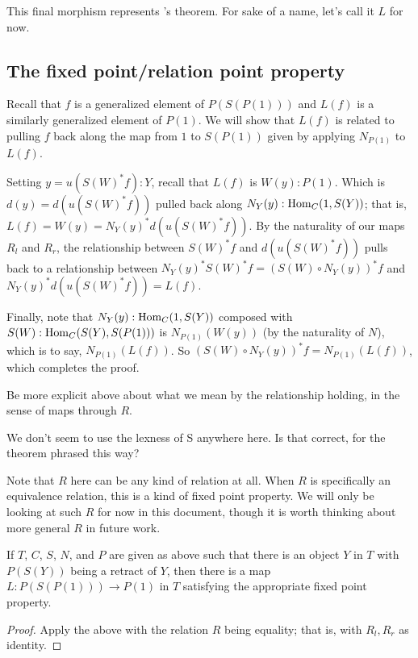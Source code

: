 This final morphism represents \Loeb's theorem. For sake of a name, let's call it $L$ for now.

\subsection{The fixed point/relation point property}
Recall that $f$ is a generalized element of $P(S(P(1)))$ and $L(f)$ is a similarly generalized element of $P(1)$. We will show that $L(f)$ is related to pulling $f$ back along the map from $1$ to $S(P(1))$ given by applying $N_{P(1)}$ to $L(f)$.

Setting $y = u(S(W)^* f) : Y$, recall that $L(f)$ is $W(y) : P(1)$. Which is $d(y) = d(u(S(W)^* f))$ pulled back along $N_Y(y) : \operatorname{Hom}_C(1, S(Y))$; that is, $L(f) = W(y) = N_Y(y)^* d(u(S(W)^* f))$. By the naturality of our maps $R_l$ and $R_r$, the relationship between $S(W)^*f$ and $d(u(S(W)^*f))$ pulls back to a relationship between $N_Y(y)^* S(W)^*f = (S(W) \circ N_Y(y))^* f$ and $N_Y(y)^* d(u(S(W)^*f)) = L(f)$.

Finally, note that $N_Y(y) : \operatorname{Hom}_C(1, S(Y))$ composed with $S(W) : \operatorname{Hom}_C(S(Y), S(P(1)))$ is $N_{P(1)}(W(y))$ (by the naturality of $N$), which is to say, $N_{P(1)}(L(f))$. So $(S(W) \circ N_Y(y))^* f = N_{P(1)}(L(f))$, which completes the proof.

\begin{TODOblock}
Be more explicit above about what we mean by the relationship holding, in the sense of maps through $R$.
\end{TODOblock}

\begin{TODOblock}
We don't seem to use the lexness of S anywhere here. Is that correct, for the theorem phrased this way?
\end{TODOblock}

Note that $R$ here can be any kind of relation at all. When $R$ is specifically an equivalence relation, this is a kind of fixed point property. We will only be looking at such $R$ for now in this document, though it is worth thinking about more general $R$ in future work.

\begin{corollary}\label{RetractInT}
If $T$, $C$, $S$, $N$, and $P$ are given as above such that there is an object $Y$ in $T$ with $P(S(Y))$ being a retract of $Y$, then there is a map $L : P(S(P(1))) \to P(1)$ in $T$ satisfying the appropriate fixed point property.
\end{corollary}
\begin{proof}
Apply the above with the relation $R$ being equality; that is, with $R_l, R_r$ as identity.
\end{proof}

